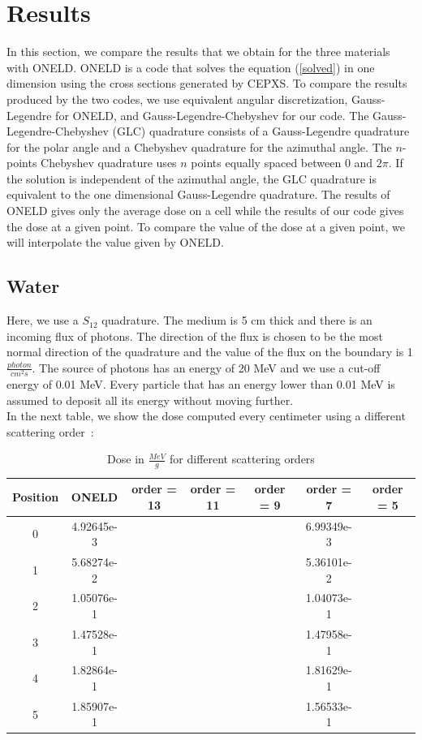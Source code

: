 \section{Results}
In this section, we compare the results that we obtain for the three materials 
with ONELD\cite{cepxs}. ONELD is a code that solves the  
equation (\ref{solved}) in one dimension using the cross sections generated by CEPXS. 
To compare the results produced by the two codes, we use equivalent angular 
discretization, Gauss-Legendre for ONELD, and Gauss-Legendre-Chebyshev for our
code. The Gauss-Legendre-Chebyshev (GLC) quadrature consists of a Gauss-Legendre
quadrature for the polar angle and a Chebyshev quadrature for the azimuthal
angle. The $n$-points Chebyshev quadrature uses $n$ points equally spaced
between 0 and $2\pi$. If the solution is independent of the azimuthal angle,
the GLC quadrature is equivalent to the one dimensional Gauss-Legendre
quadrature. The results of ONELD gives only the average dose on a cell while
the results of our code gives the dose at a given point. To compare the value of 
the dose at a given point, we will interpolate the value given by ONELD.

\subsection{Water}
Here, we use a $S_{12}$ quadrature. The medium is 5 cm thick and there is an 
incoming flux of photons. The direction of the flux is chosen to be the most 
normal direction of the quadrature and the value of the flux on the boundary is 1 
$\frac{photon}{cm^2s}$. The source of photons has an energy of 20 MeV and we use 
a cut-off energy of 0.01 MeV. Every particle that has an energy lower than 
0.01 MeV is assumed to deposit all its energy without moving further.\\
In the next table, we show the dose computed every centimeter using a
different scattering \hbox{order :}
\begin{table}[H]
\begin{center}
\caption{Dose in $\frac{MeV}{g}$ for different scattering orders}
\begin{tabular}{|c|c|c|c|c|c|c|}
\hline
Position & ONELD & order = 13 & order = 11 & order = 9 & order = 7 & order = 5 \\
\hline
0 & 4.92645e-3 &  &  &  & 6.99349e-3 &  \\
1 & 5.68274e-2 &  &  &  & 5.36101e-2 &  \\
2 & 1.05076e-1 &  &  &  & 1.04073e-1 &  \\
3 & 1.47528e-1 &  &  &  & 1.47958e-1 &  \\
4 & 1.82864e-1 &  &  &  & 1.81629e-1 &  \\
5 & 1.85907e-1 &  &  &  & 1.56533e-1 &  \\
\hline
\end{tabular}
\end{center}
\end{table}     

